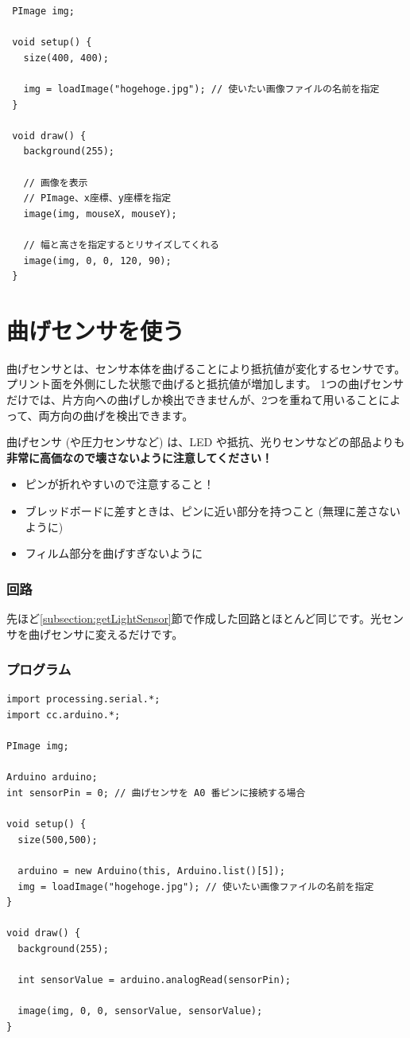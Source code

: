 \documentclass[11pt,a4paper]{jarticle}
\begin{document}
\begin{lstlisting}
 PImage img;
 
 void setup() {
   size(400, 400);

   img = loadImage("hogehoge.jpg"); // 使いたい画像ファイルの名前を指定
 }

 void draw() {
   background(255);

   // 画像を表示
   // PImage、x座標、y座標を指定
   image(img, mouseX, mouseY);

   // 幅と高さを指定するとリサイズしてくれる
   image(img, 0, 0, 120, 90);
 }
\end{lstlisting}

\section{曲げセンサを使う}
曲げセンサとは、センサ本体を曲げることにより抵抗値が変化するセンサです。
プリント面を外側にした状態で曲げると抵抗値が増加します。
1つの曲げセンサだけでは、片方向への曲げしか検出できませんが、2つを重ねて用いることによって、両方向の曲げを検出できます。

曲げセンサ (や圧力センサなど) は、LED や抵抗、光りセンサなどの部品よりも\textbf{非常に高価なので壊さないように注意してください！}

\begin{itemize}
 \item ピンが折れやすいので注意すること！
 \item ブレッドボードに差すときは、ピンに近い部分を持つこと (無理に差さないように)
 \item フィルム部分を曲げすぎないように
\end{itemize}

\subsubsection*{回路}
先ほど\ref{subsection:getLightSensor}節で作成した回路とほとんど同じです。光センサを曲げセンサに変えるだけです。

\subsubsection*{プログラム}
\begin{lstlisting}
import processing.serial.*;
import cc.arduino.*;

PImage img;

Arduino arduino;
int sensorPin = 0; // 曲げセンサを A0 番ピンに接続する場合

void setup() {
  size(500,500);
  
  arduino = new Arduino(this, Arduino.list()[5]);
  img = loadImage("hogehoge.jpg"); // 使いたい画像ファイルの名前を指定
}

void draw() {
  background(255);
  
  int sensorValue = arduino.analogRead(sensorPin);
    
  image(img, 0, 0, sensorValue, sensorValue);
}
\end{lstlisting}
\end{document}
